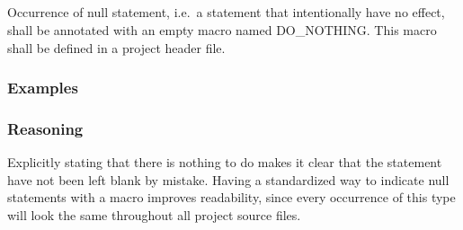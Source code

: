 \subsection*{\codingRule{}}

Occurrence of null statement, i.e.\ a statement that intentionally have no effect, shall be annotated with an empty macro named DO\_NOTHING. This macro shall be defined in a project header file.    %

\subsubsection*{Examples}

\noindent
\begin{minipage}[t]{\codelstwidth\linewidth}
    
\end{minipage}
\hfill
\begin{minipage}[t]{\codelstwidth\linewidth}
     
    
\end{minipage}

\subsubsection*{Reasoning}

Explicitly stating that there is nothing to do makes it clear that the statement have not been left blank by mistake. Having a standardized way to indicate null statements with a macro improves readability, since every occurrence of this type will look the same throughout all project source files.